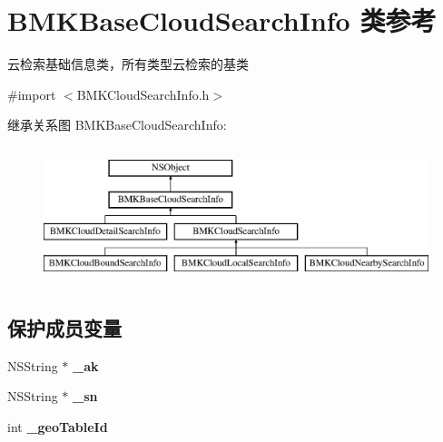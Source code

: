 \hypertarget{interface_b_m_k_base_cloud_search_info}{\section{B\-M\-K\-Base\-Cloud\-Search\-Info 类参考}
\label{interface_b_m_k_base_cloud_search_info}
}


云检索基础信息类，所有类型云检索的基类  




{\ttfamily \#import $<$B\-M\-K\-Cloud\-Search\-Info.\-h$>$}

继承关系图 B\-M\-K\-Base\-Cloud\-Search\-Info\-:\begin{figure}[H]
\begin{center}
\leavevmode
\includegraphics[height=4.000000cm]{interface_b_m_k_base_cloud_search_info}
\end{center}
\end{figure}
\subsection*{保护成员变量}
\begin{DoxyCompactItemize}
\item 
\hypertarget{interface_b_m_k_base_cloud_search_info_a7e0ee4faf41da0365d2f427b677f621a}{N\-S\-String $\ast$ {\bfseries \-\_\-ak}}\label{interface_b_m_k_base_cloud_search_info_a7e0ee4faf41da0365d2f427b677f621a}

\item 
\hypertarget{interface_b_m_k_base_cloud_search_info_a2c8bc1521f7025190278e3f29647c652}{N\-S\-String $\ast$ {\bfseries \-\_\-sn}}\label{interface_b_m_k_base_cloud_search_info_a2c8bc1521f7025190278e3f29647c652}

\item 
\hypertarget{interface_b_m_k_base_cloud_search_info_a3d23b81d16c3054a5b73c2f017b435c3}{int {\bfseries \-\_\-geo\-Table\-Id}}\label{interface_b_m_k_base_cloud_search_info_a3d23b81d16c3054a5b73c2f017b435c3}

\end{DoxyCompactItemize}
